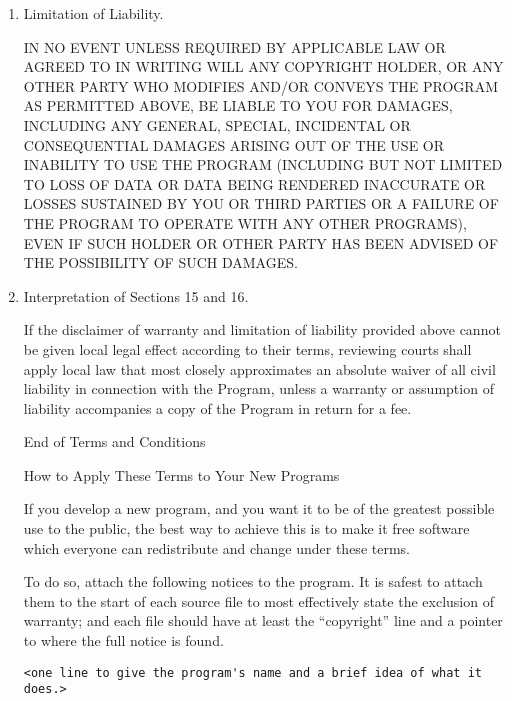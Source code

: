 \documentclass[11pt]{article}
\begin{document}
\begin{enumerate}
  \item Limitation of Liability.

        IN NO EVENT UNLESS REQUIRED BY APPLICABLE LAW OR AGREED TO IN
        WRITING WILL ANY COPYRIGHT HOLDER, OR ANY OTHER PARTY WHO MODIFIES
        AND/OR CONVEYS THE PROGRAM AS PERMITTED ABOVE, BE LIABLE TO YOU FOR
        DAMAGES, INCLUDING ANY GENERAL, SPECIAL, INCIDENTAL OR CONSEQUENTIAL
        DAMAGES ARISING OUT OF THE USE OR INABILITY TO USE THE PROGRAM
        (INCLUDING BUT NOT LIMITED TO LOSS OF DATA OR DATA BEING RENDERED
        INACCURATE OR LOSSES SUSTAINED BY YOU OR THIRD PARTIES OR A FAILURE
        OF THE PROGRAM TO OPERATE WITH ANY OTHER PROGRAMS), EVEN IF SUCH
        HOLDER OR OTHER PARTY HAS BEEN ADVISED OF THE POSSIBILITY OF SUCH
        DAMAGES.

  \item Interpretation of Sections 15 and 16.

        If the disclaimer of warranty and limitation of liability provided
        above cannot be given local legal effect according to their terms,
        reviewing courts shall apply local law that most closely approximates
        an absolute waiver of all civil liability in connection with the
        Program, unless a warranty or assumption of liability accompanies a
        copy of the Program in return for a fee.

        \begin{center}
          {\Large\sc End of Terms and Conditions}

          \bigskip
          How to Apply These Terms to Your New Programs
        \end{center}

        If you develop a new program, and you want it to be of the greatest
        possible use to the public, the best way to achieve this is to make it
        free software which everyone can redistribute and change under these terms.

        To do so, attach the following notices to the program.  It is safest
        to attach them to the start of each source file to most effectively
        state the exclusion of warranty; and each file should have at least
        the ``copyright'' line and a pointer to where the full notice is found.

          {\footnotesize
            \begin{verbatim}
<one line to give the program's name and a brief idea of what it does.>


\end{verbatim}}
\end{enumerate}
\end{document}
